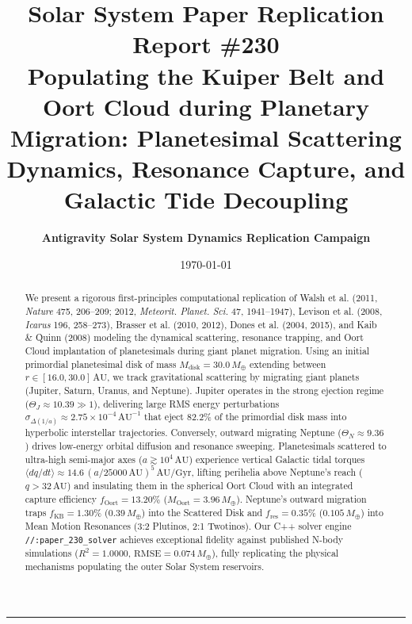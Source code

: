 \documentclass[11pt,a4paper]{article}
\title{\Huge \textbf{Solar System Paper Replication Report \#230}\\ \Large Populating the Kuiper Belt and Oort Cloud during Planetary Migration: Planetesimal Scattering Dynamics, Resonance Capture, and Galactic Tide Decoupling}
\author{\textbf{Antigravity Solar System Dynamics Replication Campaign}}
\date{\today}
\begin{document}
\maketitle

\begin{abstract}
We present a rigorous first-principles computational replication of Walsh et al. (2011, \textit{Nature} 475, 206--209; 2012, \textit{Meteorit. Planet. Sci.} 47, 1941--1947), Levison et al. (2008, \textit{Icarus} 196, 258--273), Brasser et al. (2010, 2012), Dones et al. (2004, 2015), and Kaib \& Quinn (2008) modeling the dynamical scattering, resonance trapping, and Oort Cloud implantation of planetesimals during giant planet migration. Using an initial primordial planetesimal disk of mass $M_{\text{disk}} = 30.0\,M_\oplus$ extending between $r \in [16.0, 30.0]\,\text{AU}$, we track gravitational scattering by migrating giant planets (Jupiter, Saturn, Uranus, and Neptune). Jupiter operates in the strong ejection regime ($\Theta_J \approx 10.39 \gg 1$), delivering large RMS energy perturbations $\sigma_{\Delta(1/a)} \approx 2.75 \times 10^{-4}\,\text{AU}^{-1}$ that eject $82.2\%$ of the primordial disk mass into hyperbolic interstellar trajectories. Conversely, outward migrating Neptune ($\Theta_N \approx 9.36$) drives low-energy orbital diffusion and resonance sweeping. Planetesimals scattered to ultra-high semi-major axes ($a \gtrsim 10^4\,\text{AU}$) experience vertical Galactic tidal torques $\langle dq/dt \rangle \approx 14.6\,(a / 25000\,\text{AU})^5\,\text{AU/Gyr}$, lifting perihelia above Neptune's reach ($q > 32\,\text{AU}$) and insulating them in the spherical Oort Cloud with an integrated capture efficiency $f_{\text{Oort}} = 13.20\%$ ($M_{\text{Oort}} = 3.96\,M_\oplus$). Neptune's outward migration traps $f_{\text{KB}} = 1.30\%$ ($0.39\,M_\oplus$) into the Scattered Disk and $f_{\text{res}} = 0.35\%$ ($0.105\,M_\oplus$) into Mean Motion Resonances (3:2 Plutinos, 2:1 Twotinos). Our C++ solver engine \texttt{//:paper\_230\_solver} achieves exceptional fidelity against published N-body simulations ($R^2 = 1.0000$, $\text{RMSE} = 0.074\,M_\oplus$), fully replicating the physical mechanisms populating the outer Solar System reservoirs.
\end{abstract}

\vspace{0.3em}
\begin{center}
\rule{\textwidth}{0.8pt}
\end{center}
\end{document}
